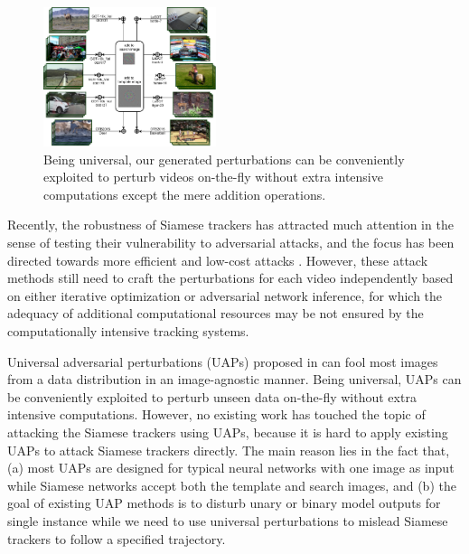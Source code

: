 \documentclass[journal]{IEEEtran}
\begin{document}
\begin{figure}[t]
  \centering
  \includegraphics[width=0.45\textwidth]{images_imperceptible/UAP_small.pdf}
  \caption{Being universal, our generated perturbations can be conveniently exploited to perturb videos on-the-fly without extra intensive computations except the mere addition operations.}
  \label{fig:UAP}
  \vspace{-4mm}
\end{figure}

Recently, the robustness of Siamese trackers has attracted much attention in the sense of testing their vulnerability to adversarial attacks, and the focus has been directed towards more efficient and low-cost attacks \cite{TTP,FAN,SPARK,chen2020one}. However, these attack methods still need to craft the perturbations for each video independently based on either iterative optimization or adversarial network inference, for which the adequacy of additional computational resources may be not ensured by the computationally intensive tracking systems. 

Universal adversarial perturbations (UAPs) proposed in \cite{UAP} can fool most images from a data distribution in an image-agnostic manner. Being universal, UAPs can be conveniently exploited to perturb unseen data on-the-fly without extra intensive computations. However, no existing work has touched the topic of attacking the Siamese trackers using UAPs, because it is hard to apply existing UAPs to attack Siamese trackers directly. The main reason lies in the fact that, (a) most UAPs are designed for typical neural networks with one image as input while Siamese networks accept both the template and search images, and (b) the goal of existing UAP methods is to disturb unary or binary model outputs for single instance while we need to use universal perturbations to mislead Siamese trackers to follow a specified trajectory.
 
\end{document}
